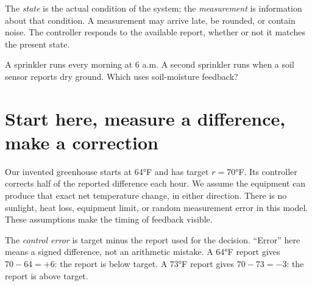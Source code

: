\documentclass[11pt,letterpaper]{article}
\begin{document}
\par{}\par\medskip

The \emph{state} is the actual condition of the system; the \emph{measurement} is information about that condition. A measurement may arrive late, be rounded, or contain noise. The controller responds to the available report, whether or not it matches the present state.


\begin{tcolorbox}[title={Pause and try 2},breakable]
A sprinkler runs every morning at 6 a.m. A second sprinkler runs when a soil sensor reports dry ground. Which uses soil-moisture feedback?
\end{tcolorbox}

\clearpage

\section{Start here, measure a difference, make a correction}

Our invented greenhouse starts at 64°F and has target \(r=70\)°F. Its controller corrects half of the reported difference each hour. We assume the equipment can produce that exact net temperature change, in either direction. There is no sunlight, heat loss, equipment limit, or random measurement error in this model. These assumptions make the timing of feedback visible.


The \emph{control error} is target minus the report used for the decision. ``Error'' here means a signed difference, not an arithmetic mistake. A 64°F report gives \(70-64=+6\): the report is below target. A 73°F report gives \(70-73=-3\): the report is above target.
\end{document}
